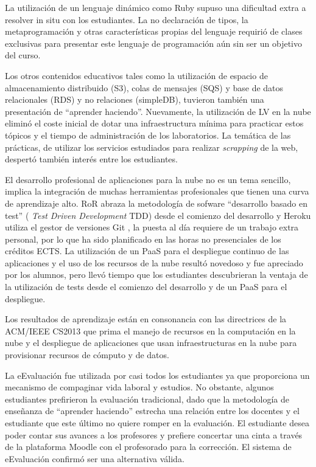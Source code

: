 \documentclass[conference]{IEEEtran}
\begin{document}
La utilización de un lenguaje dinámico como Ruby supuso una dificultad extra a
resolver in situ con los estudiantes. La no declaración de tipos, la
metaprogramación y otras características propias del lenguaje requirió de
clases exclusivas para presentar este lenguaje de programación aún sin ser un
objetivo del curso. 

Los otros contenidos educativos tales como la utilización de espacio de
almacenamiento distribuido (S3), colas de mensajes (SQS) y  base de datos
relacionales (RDS) y no relaciones (simpleDB), tuvieron también una presentación
de ``aprender haciendo''. Nuevamente, la utilización de LV en la nube eliminó el
coste inicial de dotar una infraestructura mínima para practicar estos tópicos
y el tiempo de administración de los  laboratorios. La temática de las
prácticas, de utilizar los servicios estudiados  para
realizar \textit{scrapping} de la web, despertó también interés entre los
estudiantes.

El desarrollo profesional de aplicaciones para la nube no es un tema sencillo,
implica la integración de muchas herramientas profesionales que tienen una
curva de aprendizaje alto.
RoR abraza la metodología de sofware ``desarrollo basado en test'' ( \textit{Test Driven Development} TDD) \cite{Rappin:2010} desde el comienzo del desarrollo y
Heroku utiliza el gestor de versiones Git \cite{Chacon:2009},
 la puesta al día requiere de un trabajo extra personal, por lo que ha sido planificado en las horas no presenciales de los créditos ECTS.
La utilización de un PaaS para el despliegue continuo de las aplicaciones y el uso de los recursos de la nube resultó novedoso y fue apreciado por los alumnos,
pero llevó tiempo que los estudiantes descubrieran la ventaja de la utilización de tests desde el comienzo del desarrollo y de un PaaS para el despliegue.




Los resultados de aprendizaje están en consonancia con las directrices de la ACM/IEEE CS2013 que prima el manejo de recursos en la computación en la nube
y el despliegue de aplicaciones que usan infraestructuras en la nube para provisionar recursos de cómputo y de datos.

La eEvaluación fue utilizada por casi todos los estudiantes ya que proporciona un mecanismo de compaginar vida laboral y estudios. No obstante, algunos estudiantes prefirieron la evaluación tradicional,
dado que la metodología de enseñanza de ``aprender haciendo'' estrecha una relación entre los docentes y el estudiante que este último no quiere romper en la evaluación.
El estudiante desea poder contar sus avances a los profesores y prefiere concertar una cinta a través de la plataforma Moodle con el profesorado para la corrección.
El sistema de eEvaluación confirmó ser una alternativa válida.
\end{document}
